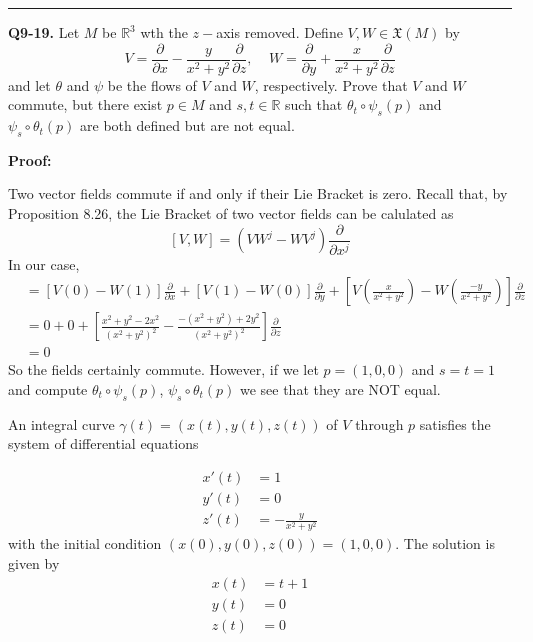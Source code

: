 \documentclass{article}
\newcommand{\R}{\mathbb{R}}
\begin{document}
\vskip 0.5cm
\hrule 
\vskip 0.5cm



\textbf{Q9-19.} Let $M$ be $\R^3$ wth the $z-$axis removed. Define $V, W \in \mathfrak{X}(M)$ by 
\[ V = \frac{\partial}{\partial x} - \frac{y}{x^2 + y^2} \frac{\partial}{\partial z},\;\;\;\;W = \frac{\partial}{\partial y} + \frac{x}{x^2 + y^2}\frac{\partial}{\partial z} \] and let $\theta$ and $\psi$ be the flows of $V$ and $W$, respectively. Prove that $V$ and $W$ commute, but there exist $p \in M$ and $s, t \in \R$ such that $\theta_t \circ \psi_s(p)$ and $\psi_s \circ \theta_t(p)$ are both defined but are not equal.

\vskip 0.5cm
\textbf{Proof:}

Two vector fields commute if and only if their Lie Bracket is zero. Recall that, by Proposition 8.26, the Lie Bracket of two vector fields can be calulated as 
\[ [V, W] = \left(VW^j - WV^j\right) \frac{\partial}{\partial x^j}  \]
In our case, 
\begin{align*}
  [V, W] &= \left[V(0) - W(1)\right]\frac{\partial}{\partial x} +  \left[V(1) - W(0)\right]\frac{\partial}{\partial y} +  \left[V\left(\frac{x}{x^2 + y^2}\right) - W \left(\frac{-y}{x^2 + y^2}\right) \right]\frac{\partial}{\partial z} \\
  &= 0 + 0 + \left[ \frac{x^2 + y^2 - 2x^2}{(x^2 + y^2)^2} - \frac{-(x^2 + y^2) + 2y^2}{(x^2 + y^2)^2} \right] \frac{\partial}{\partial z} \\
  &= 0
\end{align*}
So the fields certainly commute. However, if we let $p = (1, 0, 0)$ and $s = t = 1$ and compute $\theta_t \circ \psi_s(p)$, $\psi_s \circ \theta_t(p)$ we see that they are NOT equal.

\vskip 0.5cm
An integral curve $\gamma(t) = \left(x(t), y(t), z(t)\right)$ of $V$ through $p$ satisfies the system of differential equations

\begin{align*}
  x'(t) &= 1\\
  y'(t) &= 0 \\
  z'(t) &= -\frac{y}{x^2 + y^2}
\end{align*}
with the initial condition $(x(0), y(0), z(0)) = (1, 0, 0)$. The solution is given by 
\begin{align*}
  x(t) &= t + 1 \\
  y(t) &= 0 \\
  z(t) &= 0
\end{align*}
\end{document}
